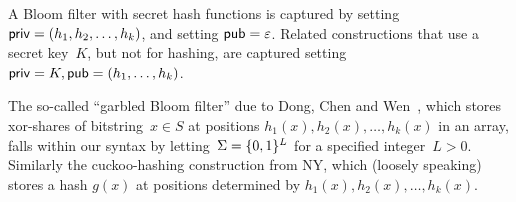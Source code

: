 A Bloom filter with secret hash functions is captured by setting ${\sf priv}=(h_1,h_2,\ldots,h_k)$, and setting ${\sf pub}=\varepsilon$.  Related constructions  that use a secret key~$K$, but not for hashing, are captured setting ${\sf priv}=K, {\sf pub}=(h_1, \ldots, h_k)$.

The so-called ``garbled Bloom filter'' due to Dong, Chen and Wen~\cite{xxx}, which stores xor-shares of bitstring~$x \in S$ at positions $h_1(x),h_2(x),\ldots,h_k(x)$ in an array, falls within our syntax by letting~$\Sigma=\{0,1\}^L$ for a specified integer~$L>0$.  Similarly the cuckoo-hashing construction from NY, which (loosely speaking) stores a hash $g(x)$ at positions determined by $h_1(x),h_2(x),\ldots,h_k(x)$. 
